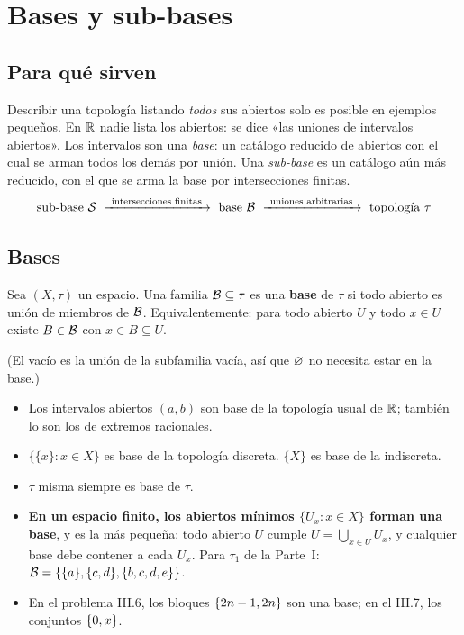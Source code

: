 \section{Bases y sub-bases}\label{sec:bases}
\subsection{Para qué sirven}
Describir una topología listando \emph{todos} sus abiertos solo es posible en ejemplos pequeños. En $\mathbb{R}$ nadie lista
los abiertos: se dice «las uniones de intervalos abiertos». Los intervalos son una \emph{base}: un catálogo reducido de
abiertos con el cual se arman todos los demás por unión. Una \emph{sub-base} es un catálogo aún más reducido, con el
que se arma la base por intersecciones finitas.
\[\text{sub-base }\mathcal{S}\ \xrightarrow{\ \text{intersecciones finitas}\ }\ \text{base }\mathcal{B}\
\xrightarrow{\ \text{uniones arbitrarias}\ }\ \text{topología }\tau\]

\subsection{Bases}
\begin{definicion}
Sea $(X,\tau)$ un espacio. Una familia $\mathcal{B}\subseteq\tau$ es una \textbf{base} de $\tau$ si todo abierto es unión de
miembros de $\mathcal{B}$. Equivalentemente: para todo abierto $U$ y todo $x\in U$ existe $B\in\mathcal{B}$ con $x\in B\subseteq U$.
\end{definicion}
(El vacío es la unión de la subfamilia vacía, así que $\varnothing$ no necesita estar en la base.)

\begin{ejemplo}
\begin{itemize}
\item Los intervalos abiertos $(a,b)$ son base de la topología usual de $\mathbb{R}$; también lo son los de extremos
racionales.
\item $\{\{x\}:x\in X\}$ es base de la topología discreta. $\{X\}$ es base de la indiscreta.
\item $\tau$ misma siempre es base de $\tau$.
\item \textbf{En un espacio finito, los abiertos mínimos $\{U_x:x\in X\}$ forman una base}, y es la más pequeña: todo
abierto $U$ cumple $U=\bigcup_{x\in U}U_x$, y cualquier base debe contener a cada $U_x$. Para $\tau_1$ de la Parte~I:
$\mathcal{B}=\{\{a\},\{c,d\},\{b,c,d,e\}\}$.
\item En el problema III.6, los bloques $\{2n-1,2n\}$ son una base; en el III.7, los conjuntos $\{0,x\}$.
\end{itemize}
\end{ejemplo}

